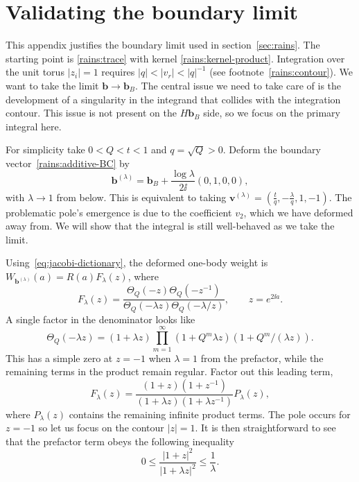 \section{Validating the boundary limit}
\label{app:rains-limit}
This appendix justifies the boundary limit used in section~\ref{sec:rains}. The
starting point is \eqref{rains:trace} with kernel \eqref{rains:kernel-product}.
Integration over the unit torus $|z_i|=1$ requires $|q|<|v_r|<|q|^{-1}$
(see footnote~\ref{rains:contour}). We want to take the limit
$\mathbf{b}\rightarrow \mathbf{b}_B$. The central issue we need to take care of
is the development of a singularity in the integrand that collides with the
integration contour. This issue is not present on the $H \mathbf{b}_B$ side, so
we focus on the primary integral here.

For simplicity take $0<Q<t<1$ and $q=\sqrt Q>0$. Deform the boundary
vector~\eqref{rains:additive-BC} by
\begin{equation}
  \mathbf{b}^{(\lambda)}
  =\mathbf{b}_B+\frac{\log\lambda}{2\ii}(0,1,0,0),
\end{equation}
with $\lambda\rightarrow1$ from below. This is equivalent to taking
$\mathbf{v}^{(\lambda)}=\left(\frac{t}{q},-\frac{\lambda}{q},1,-1\right)$.
The problematic pole's emergence is due to the coefficient $v_2$, which we have
deformed away from. We will show that the integral is still well-behaved as we
take the limit.

Using~\eqref{eq:jacobi-dictionary}, the deformed one-body weight is
$W_{\mathbf{b}^{(\lambda)}}(a)=R(a)F_\lambda(z)$, where
\begin{equation}
  F_\lambda(z)=
  \frac{\Theta_Q(-z)\Theta_Q(-z^{-1})}
  {\Theta_Q(-\lambda z)\Theta_Q(-\lambda/z)},
  \qquad z=e^{2\ii a}.
  \label{rains:boundary-limit}
\end{equation}
A single factor in the denominator looks like
\begin{equation}
  \Theta_Q(-\lambda z) = (1+\lambda z)
  \prod_{m=1}^\infty(1+Q^m\lambda z)(1+Q^{m}/(\lambda z)).
\end{equation}
This has a simple zero at $z=-1$ when $\lambda=1$ from the prefactor, while the
remaining terms in the product remain regular. Factor out this leading term,
\begin{equation}
  F_\lambda(z)=\frac{(1+z)(1+z^{-1})}{(1+\lambda z)(1+\lambda z^{-1})}
  P_\lambda(z),
\end{equation}
where $P_\lambda(z)$ contains the remaining infinite product terms. The pole
occurs for $z=-1$ so let us focus on the contour $|z|=1$. It is then
straightforward to see that the prefactor term obeys the following inequality
\begin{equation}
  0\leqslant \frac{|1+z|^2}{|1+\lambda z|^2}\leqslant \frac{1}{\lambda}.
  \label{rains:boundary-bound}
\end{equation}

